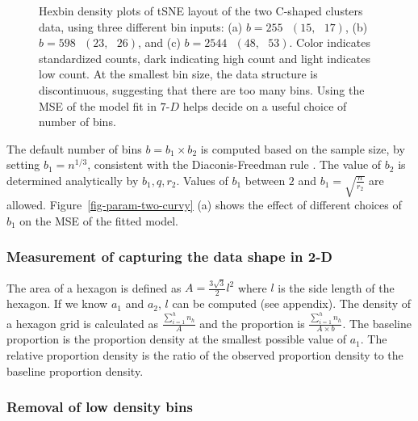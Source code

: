 \documentclass[
  12pt]{article}
\begin{document}
\begin{figure}[H]


\caption{\label{fig-bins-two-curvy}Hexbin density plots of tSNE layout
of the two C-shaped clusters data, using three different bin inputs: (a)
\(b = 255 \text{ } (15, \text{ }17)\), (b)
\(b = 598 \text{ } (23, \text{ }26)\), and (c)
\(b = 2544 \text{ } (48, \text{ }53)\). Color indicates standardized
counts, dark indicating high count and light indicates low count. At the
smallest bin size, the data structure is discontinuous, suggesting that
there are too many bins. Using the MSE of the model fit in
\(7\text{-}D\) helps decide on a useful choice of number of bins.}

\end{figure}%

The default number of bins \(b=b_1\times b_2\) is computed based on the
sample size, by setting \(b_1=n^{1/3}\), consistent with the
Diaconis-Freedman rule \citep{freedman1981}. The value of \(b_2\) is
determined analytically by \(b_1, q, r_2\). Values of \(b_1\) between
\(2\) and \(b_1 = \sqrt{\frac{n}{r_2}}\) are allowed.
Figure~\ref{fig-param-two-curvy} (a) shows the effect of different
choices of \(b_1\) on the MSE of the fitted model.

\subsubsection{Measurement of capturing the data shape in
2-D}\label{measurement-of-capturing-the-data-shape-in-2-d}

The area of a hexagon is defined as \(A = \frac{3\sqrt{3}}{2}l^2\) where
\(l\) is the side length of the hexagon. If we know \(a_1\) and \(a_2\),
\(l\) can be computed (see appendix). The density of a hexagon grid is
calculated as \(\frac{\sum^{h}_{i=1}n_h}{A}\) and the proportion is
\(\frac{\sum^{h}_{i=1}n_h}{A \times b}\). The baseline proportion is the
proportion density at the smallest possible value of \(a_1\). The
relative proportion density is the ratio of the observed proportion
density to the baseline proportion density.

\subsubsection{Removal of low density
bins}\label{removal-of-low-density-bins}
\end{document}
